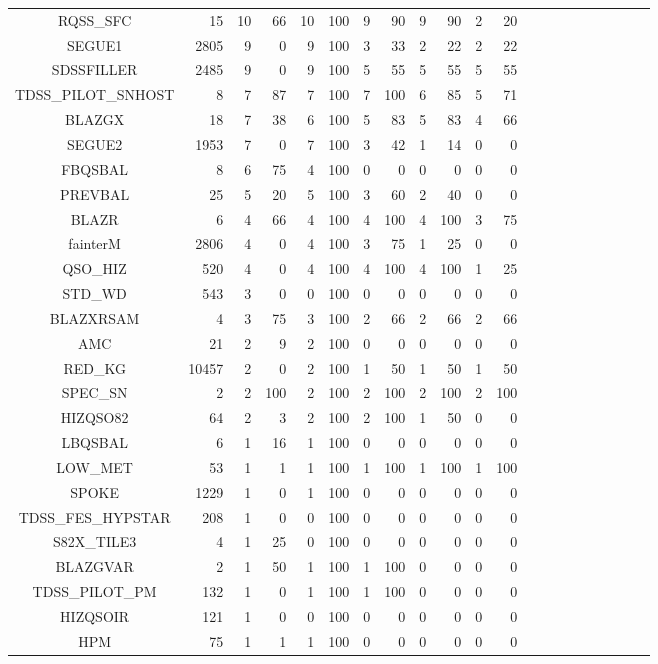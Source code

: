 \documentclass[onecolumn]{aa}
\begin{document}
\begin{center}
\begin{longtable}{c rrr rrr rrrrrrrrrrrrrr}
RQSS\_SFC & 15 & 10 & 66 & 10 & 100 & 9 & 90 & 9 & 90 & 2 & 20 \\ 
SEGUE1 & 2805 & 9 & 0 & 9 & 100 & 3 & 33 & 2 & 22 & 2 & 22 \\ 
SDSSFILLER & 2485 & 9 & 0 & 9 & 100 & 5 & 55 & 5 & 55 & 5 & 55 \\ 
TDSS\_PILOT\_SNHOST & 8 & 7 & 87 & 7 & 100 & 7 & 100 & 6 & 85 & 5 & 71 \\ 
BLAZGX & 18 & 7 & 38 & 6 & 100 & 5 & 83 & 5 & 83 & 4 & 66 \\ 
SEGUE2 & 1953 & 7 & 0 & 7 & 100 & 3 & 42 & 1 & 14 & 0 & 0 \\ 
FBQSBAL & 8 & 6 & 75 & 4 & 100 & 0 & 0 & 0 & 0 & 0 & 0 \\ 
PREVBAL & 25 & 5 & 20 & 5 & 100 & 3 & 60 & 2 & 40 & 0 & 0 \\ 
BLAZR & 6 & 4 & 66 & 4 & 100 & 4 & 100 & 4 & 100 & 3 & 75 \\ 
fainterM & 2806 & 4 & 0 & 4 & 100 & 3 & 75 & 1 & 25 & 0 & 0 \\ 
QSO\_HIZ & 520 & 4 & 0 & 4 & 100 & 4 & 100 & 4 & 100 & 1 & 25 \\ 
STD\_WD & 543 & 3 & 0 & 0 & 100 & 0 & 0 & 0 & 0 & 0 & 0 \\ 
BLAZXRSAM & 4 & 3 & 75 & 3 & 100 & 2 & 66 & 2 & 66 & 2 & 66 \\ 
AMC & 21 & 2 & 9 & 2 & 100 & 0 & 0 & 0 & 0 & 0 & 0 \\ 
RED\_KG & 10457 & 2 & 0 & 2 & 100 & 1 & 50 & 1 & 50 & 1 & 50 \\ 
SPEC\_SN & 2 & 2 & 100 & 2 & 100 & 2 & 100 & 2 & 100 & 2 & 100 \\ 
HIZQSO82 & 64 & 2 & 3 & 2 & 100 & 2 & 100 & 1 & 50 & 0 & 0 \\ 
LBQSBAL & 6 & 1 & 16 & 1 & 100 & 0 & 0 & 0 & 0 & 0 & 0 \\ 
LOW\_MET & 53 & 1 & 1 & 1 & 100 & 1 & 100 & 1 & 100 & 1 & 100 \\ 
SPOKE & 1229 & 1 & 0 & 1 & 100 & 0 & 0 & 0 & 0 & 0 & 0 \\ 
TDSS\_FES\_HYPSTAR & 208 & 1 & 0 & 0 & 100 & 0 & 0 & 0 & 0 & 0 & 0 \\ 
S82X\_TILE3 & 4 & 1 & 25 & 0 & 100 & 0 & 0 & 0 & 0 & 0 & 0 \\ 
BLAZGVAR & 2 & 1 & 50 & 1 & 100 & 1 & 100 & 0 & 0 & 0 & 0 \\ 
TDSS\_PILOT\_PM & 132 & 1 & 0 & 1 & 100 & 1 & 100 & 0 & 0 & 0 & 0 \\ 
HIZQSOIR & 121 & 1 & 0 & 0 & 100 & 0 & 0 & 0 & 0 & 0 & 0 \\ 
HPM & 75 & 1 & 1 & 1 & 100 & 0 & 0 & 0 & 0 & 0 & 0 \\ 

\end{longtable}
\end{center}
\end{document}
